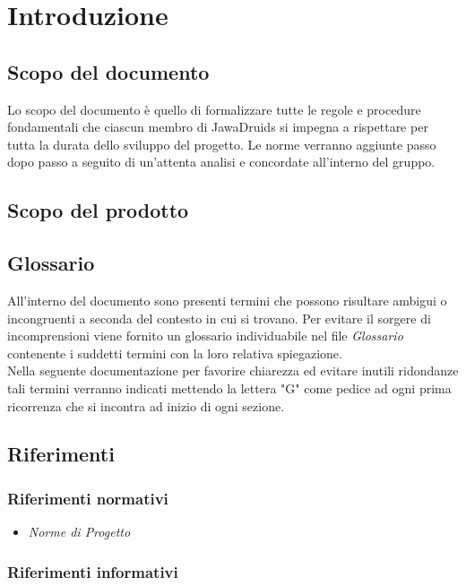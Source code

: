 \chapter{Introduzione}

\section{Scopo del documento}
Lo scopo del documento è quello di formalizzare tutte le regole e procedure fondamentali che ciascun membro di JawaDruids si impegna a rispettare per tutta la durata dello sviluppo del progetto. 
Le norme verranno aggiunte passo dopo passo a seguito di un'attenta analisi e concordate all'interno del gruppo. 
\section{Scopo del prodotto}

\section{Glossario}
All'interno del documento sono presenti termini che possono risultare ambigui o incongruenti a seconda del contesto in cui si trovano. Per evitare il sorgere di incomprensioni viene fornito un glossario individuabile nel file \textit{Glossario} contenente i suddetti termini con la loro relativa spiegazione.
\\Nella seguente documentazione per favorire chiarezza ed evitare inutili ridondanze tali termini verranno indicati mettendo la lettera "G" come pedice ad ogni prima ricorrenza che si incontra ad inizio di ogni sezione.

\section{Riferimenti}
\subsection{Riferimenti normativi}
\begin{itemize}
	\item \textit{Norme di Progetto}
\end{itemize}
\subsection{Riferimenti informativi}
